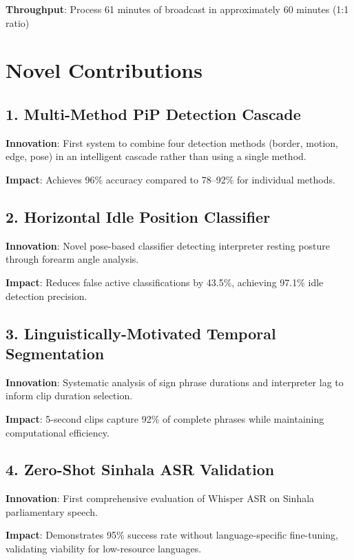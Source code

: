 \documentclass[11pt,a4paper]{article}
\begin{document}
\textbf{Throughput}: Process 61 minutes of broadcast in approximately 60 minutes (1:1 ratio)

\section{Novel Contributions}

\subsection{1. Multi-Method PiP Detection Cascade}

\textbf{Innovation}: First system to combine four detection methods (border, motion, edge, pose) in an intelligent cascade rather than using a single method.

\textbf{Impact}: Achieves 96\% accuracy compared to 78--92\% for individual methods.

\subsection{2. Horizontal Idle Position Classifier}

\textbf{Innovation}: Novel pose-based classifier detecting interpreter resting posture through forearm angle analysis.

\textbf{Impact}: Reduces false active classifications by 43.5\%, achieving 97.1\% idle detection precision.

\subsection{3. Linguistically-Motivated Temporal Segmentation}

\textbf{Innovation}: Systematic analysis of sign phrase durations and interpreter lag to inform clip duration selection.

\textbf{Impact}: 5-second clips capture 92\% of complete phrases while maintaining computational efficiency.

\subsection{4. Zero-Shot Sinhala ASR Validation}

\textbf{Innovation}: First comprehensive evaluation of Whisper ASR on Sinhala parliamentary speech.

\textbf{Impact}: Demonstrates 95\% success rate without language-specific fine-tuning, validating viability for low-resource languages.
\end{document}
